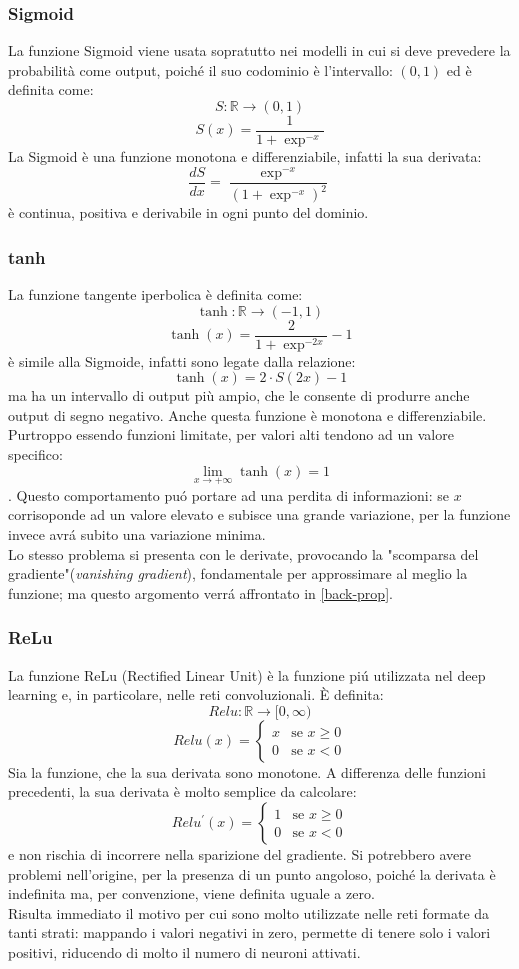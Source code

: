 \documentclass[a4paper,12pt,oneside]{book}
\begin{document}
\subsubsection{Sigmoid}
La funzione Sigmoid viene usata sopratutto nei modelli in cui si deve prevedere la probabilit\`{a} come output, poich\'{e} il suo codominio \`e l'intervallo: $(0,1)$ ed \`e definita come:
$$S:\mathbb{R}\longrightarrow(0,1)$$
$$S(x)=\frac{1}{1+\exp^{-x}}$$
La Sigmoid \`e una funzione monotona e differenziabile, infatti la sua derivata:
$$\frac{dS}{dx}=\frac{\exp^{-x}}{(1+\exp^{-x})^2}$$
\`e continua, positiva e derivabile in  ogni punto del dominio.
\newpage
\subsubsection{tanh}
La funzione tangente iperbolica \`e definita come: $$\tanh:\mathbb{R}\longrightarrow(-1,1)$$ 
$$ \tanh(x)=\frac{2}{1+\exp^{-2x}} - 1$$ 
\`e simile alla Sigmoide, infatti sono legate dalla relazione:
$$
\tanh(x)=2 \cdot S(2x)-1
$$
ma ha un intervallo di output pi\`{u} ampio, che le consente di produrre anche output di segno negativo. Anche questa funzione \`e monotona e differenziabile.\\
Purtroppo essendo funzioni limitate, per valori alti tendono ad un valore specifico: $$\lim_{x \to +\infty} \tanh(x)=1$$. Questo comportamento pu\'{o} portare ad una perdita di informazioni: se $x$ corrisoponde ad un valore elevato e subisce una grande variazione, per la funzione invece avr\'{a} subito una variazione minima.\\
Lo stesso problema si presenta con le derivate, provocando la "scomparsa del gradiente"(\textit{vanishing gradient}), fondamentale per approssimare al meglio la funzione; ma questo argomento verr\'{a} affrontato in \ref{back-prop}.
\subsubsection{ReLu}
La funzione ReLu (Rectified Linear Unit) \`e la funzione pi\'{u} utilizzata nel deep learning e, in particolare, nelle reti convoluzionali. \`{E} definita:
$$Relu:\mathbb{R}\longrightarrow [0,\infty)$$
$$
Relu(x)=
\left\{
\begin{array}{rl}
x & \mbox{se } x \geq 0 \\
0 & \mbox{se } x < 0
\end{array}
\right.
$$
Sia la funzione, che la sua derivata sono monotone. A differenza delle funzioni precedenti, la sua derivata \`e molto semplice da calcolare:
$$
Relu^{\prime}(x)=
\left\{
\begin{array}{rl}
1 & \mbox{se } x \geq 0 \\
0 & \mbox{se } x < 0
\end{array}
\right.
$$
e non rischia di incorrere nella sparizione del gradiente. Si potrebbero avere problemi nell'origine, per la presenza di un punto angoloso, poich\'{e} la derivata \`e indefinita ma, per convenzione, viene definita uguale a zero.\\
Risulta immediato il motivo per cui sono molto utilizzate nelle reti formate da tanti strati: mappando i valori negativi in zero, permette di tenere solo i valori positivi, riducendo di molto il numero di neuroni attivati.
\newpage
\end{document}
